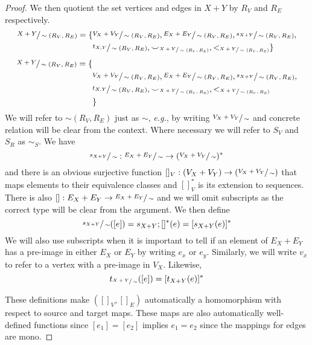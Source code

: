 \begin{proof}
We then quotient the set vertices and edges in $X + Y$ by $R_{V}$ and $R_{E}$ respectively.
\ifdefined \ONECOLUMN
\begin{align*}
    \sfrac{X + Y}{\sim (R_{V},R_{E})} = \{
        &\sfrac{V_{X} + V_{Y}}{\sim (R_{V},R_{E})}, \sfrac{E_{X} + E_{Y}}{\sim (R_{V},R_{E})}, \sfrac{s_{X+Y}}{\sim (R_{V},R_{E})},\\
        &\sfrac{t_{X,Y}}{\sim (R_{V},R_{E})}, {\smile}_{\sfrac{X+Y}{\sim (R_{V},R_{E})}}, <_{\sfrac{X + Y}{\sim (R_{V},R_{E})}}\}    
\end{align*}
\else
    \begin{align*}
        \sfrac{X + Y}{\sim (R_{V},R_{E})} = \{&\\
            &\sfrac{V_{X} + V_{Y}}{\sim (R_{V},R_{E})}, \sfrac{E_{X} + E_{Y}}{\sim (R_{V},R_{E})}, \sfrac{s_{X+Y}}{\sim (R_{V},R_{E})},\\
            &\sfrac{t_{X,Y}}{\sim (R_{V},R_{E})}, {\smile}_{\sfrac{X+Y}{\sim (R_{V},R_{E})}}, <_{\sfrac{X + Y}{\sim (R_{V},R_{E})}}\\
        & \}    
    \end{align*}
\fi
We will refer to $\sim (R_{V},R_{E})$ just as $\sim$, \textit{e.g.}, by writing $\sfrac{V_{X} + V_{Y}}{\sim}$ and concrete relation will be clear from the context.
Where necessary we will refer to $S_{V}$ and $S_{R}$ as $\sim_{S}$.
We have 
\[
    \sfrac{s_{X+Y}}{\sim} : \sfrac{E_{X} + E_{Y}}{\sim} \to (\sfrac{V_{X} + V_{Y}}{\sim})^{*}
\]
and there is an obvious surjective function $[]_{V} : (V_{X} + V_{Y}) \to (\sfrac{V_{X} + V_{Y}}{\sim})$ that maps elements to their equivalence classes and $[]_{V}^{*}$ is its extension to sequences.
There is also $[] : E_{X} + E_{Y} \to \sfrac{E_{X} + E_{Y}}{\sim}$ and we will omit subscripts as the correct type will be clear from the argument.
We then define 
\[
    \sfrac{s_{X+Y}}{\sim}([e]) = s_{X+Y};[]^{*}(e) = [s_{X+Y}(e)]^{*}
\]
We will also use subscripts when it is important to tell if an element of $E_{X} + E_{Y}$ has a pre-image in either $E_{X}$ or $E_{Y}$ by writing $e_{x}$ or $e_{y}$.
Similarly, we will write $v_{x}$ to refer to a vertex with a pre-image in $V_{X}$.
Likewise, 
\[
    t_{\sfrac{X+Y}{\sim}}([e]) = [t_{X+Y}(e)]^{*}
\]

These definitions make $([]_{V},[]_{E})$ automatically a homomorphism with respect to source and target maps.
These maps are also automatically well-defined functions since $[e_1] = [e_2]$ implies $e_1 = e_2$ since the mappings for edges are mono.



\end{proof}
